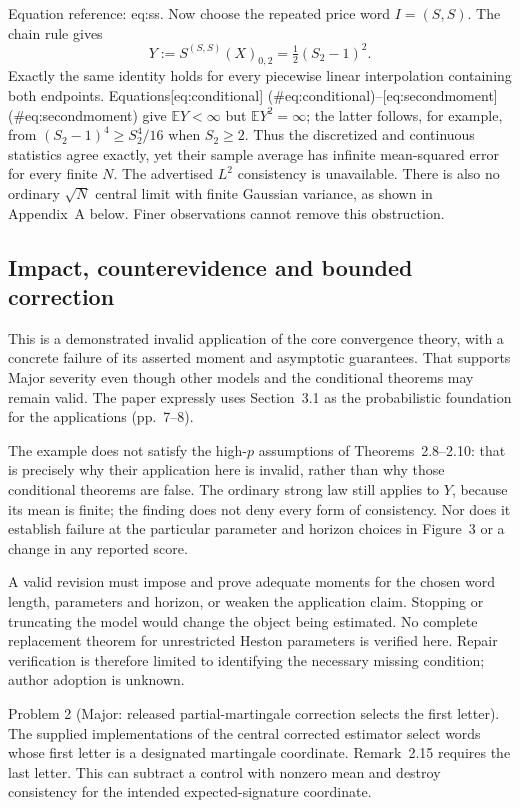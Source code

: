 \documentclass[10pt]{article}
\begin{document}
Equation reference: eq:ss. Now choose the repeated price word \(I=(S,S)\). The chain rule gives \[
 Y:=S^{(S,S)}(X)_{0,2}=\tfrac12(S_2-1)^2.\] Exactly the same identity holds for every piecewise linear interpolation containing both endpoints. Equations[eq:conditional] (\#eq:conditional)–[eq:secondmoment] (\#eq:secondmoment) give \(\mathbb EY<\infty\) but \(\mathbb EY^2=\infty\); the latter follows, for example, from \((S_2-1)^4\ge S_2^4/16\) when \(S_2\ge2\). Thus the discretized and continuous statistics agree exactly, yet their sample average has infinite mean-squared error for every finite \(N\). The advertised \(L^2\) consistency is unavailable. There is also no ordinary \(\sqrt N\) central limit with finite Gaussian variance, as shown in Appendix A below. Finer observations cannot remove this obstruction.\par
\subsection*{Impact, counterevidence and bounded correction}
This is a demonstrated invalid application of the core convergence theory, with a concrete failure of its asserted moment and asymptotic guarantees. That supports Major severity even though other models and the conditional theorems may remain valid. The paper expressly uses Section 3.1 as the probabilistic foundation for the applications (pp. 7–8).\par
The example does not satisfy the high-\(p\) assumptions of Theorems 2.8–2.10: that is precisely why their application here is invalid, rather than why those conditional theorems are false. The ordinary strong law still applies to \(Y\), because its mean is finite; the finding does not deny every form of consistency. Nor does it establish failure at the particular parameter and horizon choices in Figure 3 or a change in any reported score.\par
A valid revision must impose and prove adequate moments for the chosen word length, parameters and horizon, or weaken the application claim. Stopping or truncating the model would change the object being estimated. No complete replacement theorem for unrestricted Heston parameters is verified here. Repair verification is therefore limited to identifying the necessary missing condition; author adoption is unknown.\par
Problem 2 (Major: released partial-martingale correction selects the first letter).  The supplied implementations of the central corrected estimator select words whose first letter is a designated martingale coordinate. Remark 2.15 requires the last letter. This can subtract a control with nonzero mean and destroy consistency for the intended expected-signature coordinate.\par
\end{document}
